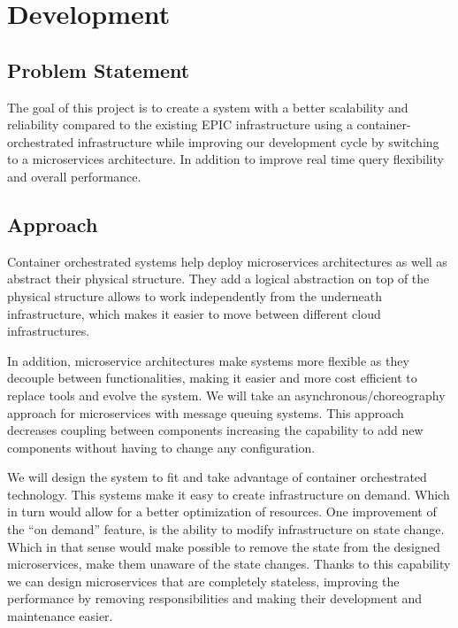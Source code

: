 
\chapter{Development} %

\label{Chapter3} %

\section{Problem Statement}
The goal of this project is to create a system with a better scalability and reliability compared to the existing EPIC infrastructure using a container-orchestrated infrastructure while improving our development cycle by switching to a microservices architecture. In addition to improve real time query flexibility and overall performance.

\section{Approach}

Container orchestrated systems help deploy microservices architectures as well as abstract their physical structure. They add a logical abstraction on top of the physical structure allows to work independently from the underneath infrastructure, which makes it easier to move between different cloud infrastructures.

In addition, microservice architectures make systems more flexible as they decouple between functionalities, making it easier and more cost efficient to replace tools and evolve the system.  We will take an asynchronous/choreography approach for microservices with message queuing systems. This approach decreases coupling between components increasing the capability to add new components without having to change any configuration.

We will design the system to fit and take advantage of container orchestrated technology. This systems make it easy to create infrastructure on demand. Which in turn would allow for a better optimization of resources. One improvement of the “on demand” feature, is the ability to modify infrastructure on state change. Which in that sense would make possible to remove the state from the designed microservices, make them unaware of the state changes. Thanks to this capability we can design microservices that are completely stateless, improving the performance by removing responsibilities and making their development  and maintenance easier.

